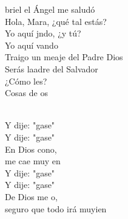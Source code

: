 \begin{cancion}[Hágase][Migueli]%
	briel el Ángel me saludó\\
	Hola, Mara, ¿qué tal estás?\\
	Yo aquí jndo, ¿y tú?\\
	Yo aquí vando\\
	Traigo un meaje del Padre Dios\\
	Serás laadre del Salvador\\
	¿Cómo les?\\
	Cosas de os\\\jump\\
	\begin{chorus}%
	Y dije: "gase" \\
	Y dije: "gase" \\
	En Dios cono, \\
	me cae muy en\\
	Y dije: "gase" \\
	Y dije: "gase" \\
	De Dios me o,\\
	seguro que todo irá muyien\\
	\end{chorus}%
	\jump\\
\end{cancion}%

